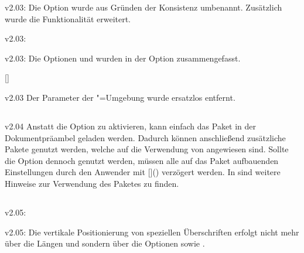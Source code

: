 \begin{Obsolete}{v2.03:}{}
\printobsoletelist%
%
Die Option  wurde aus Gründen der Konsistenz umbenannt. 
Zusätzlich wurde die Funktionalität erweitert.
\end{Obsolete}

\begin{Obsolete}{v2.03:}{}
\begin{Obsolete}{v2.03:}{}
\printobsoletelist%
%
Die Optionen  und  wurden in der Option 
 zusammengefasst.
\end{Obsolete}
\end{Obsolete}

\begin{Obsolete}{}{[]}
\begin{Obsolete}{v2.03}{}
\printobsoletelist%
%
Der Parameter  der 
"=Umgebung wurde ersatzlos entfernt.
\end{Obsolete}
\end{Obsolete}


\subsection{}
\begin{Obsolete}{v2.04}{}%
\printobsoletelist%
%
Anstatt die Option  zu aktivieren, kann einfach das Paket 
 in der Dokumentpräambel geladen werden. Dadurch können 
anschließend zusätzliche Pakete genutzt werden, welche auf die Verwendung von 
 angewiesen sind. Sollte die Option  
dennoch genutzt werden, müssen alle auf das Paket  
aufbauenden Einstellungen durch den Anwender mit %
[\PParameter{\dots}]() verzögert 
werden. In  sind weitere Hinweise zur Verwendung des Paketes 
 zu finden.
\end{Obsolete}


\subsection{}
\begin{Obsolete}{v2.05:}{}
\begin{Obsolete}{v2.05:}{}
\printobsoletelist%
%
Die vertikale Positionierung von speziellen Überschriften erfolgt nicht mehr 
über die Längen  und  sondern 
über die Optionen  sowie .
\end{Obsolete}
\end{Obsolete}


